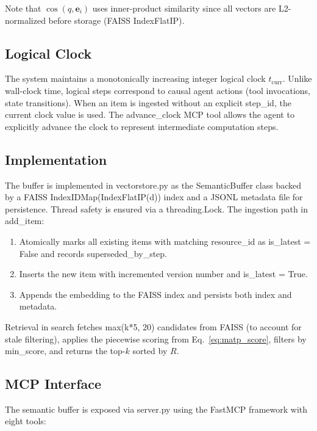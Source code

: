 \documentclass[lettersize,journal]{IEEEtran}
\begin{document}
Note that $\cos(q, \mathbf{e}_i)$ uses inner-product similarity since all vectors are L2-normalized before storage (FAISS IndexFlatIP).

\subsection{Logical Clock}

The system maintains a monotonically increasing integer logical clock $t_{\text{curr}}$. Unlike wall-clock time, logical steps correspond to causal agent actions (tool invocations, state transitions). When an item is ingested without an explicit step\_id, the current clock value is used. The advance\_clock MCP tool allows the agent to explicitly advance the clock to represent intermediate computation steps.

\subsection{Implementation}

The buffer is implemented in vectorstore.py as the SemanticBuffer class backed by a FAISS IndexIDMap(IndexFlatIP(d)) index and a JSONL metadata file for persistence. Thread safety is ensured via a threading.Lock. The ingestion path in add\_item:

\begin{enumerate}
    \item Atomically marks all existing items with matching resource\_id as is\_latest = False and records superseded\_by\_step.
    \item Inserts the new item with incremented version number and is\_latest = True.
    \item Appends the embedding to the FAISS index and persists both index and metadata.
\end{enumerate}

Retrieval in search fetches max(k*5, 20) candidates from FAISS (to account for stale filtering), applies the piecewise scoring from Eq.~\eqref{eq:matp_score}, filters by min\_score, and returns the top-$k$ sorted by $R$.

\subsection{MCP Interface}

The semantic buffer is exposed via server.py using the FastMCP framework with eight tools:
\end{document}
